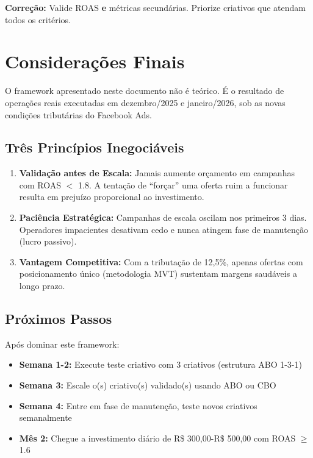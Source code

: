 \documentclass[12pt, a4paper]{article}
\newcommand{\reais}[1]{R\$ #1}
\begin{document}
\textbf{Correção:} Valide ROAS \textbf{e} métricas secundárias. Priorize criativos que atendam todos os critérios.

\needspace{8cm}

\pagebreak

\section{Considerações Finais}

O framework apresentado neste documento não é teórico. É o resultado de operações reais executadas em dezembro/2025 e janeiro/2026, sob as novas condições tributárias do Facebook Ads.

\subsection{Três Princípios Inegociáveis}

\begin{enumerate}
    \item \textbf{Validação antes de Escala:} Jamais aumente orçamento em campanhas com ROAS $<$ 1.8. A tentação de ``forçar'' uma oferta ruim a funcionar resulta em prejuízo proporcional ao investimento.

    \item \textbf{Paciência Estratégica:} Campanhas de escala oscilam nos primeiros 3 dias. Operadores impacientes desativam cedo e nunca atingem fase de manutenção (lucro passivo).

    \item \textbf{Vantagem Competitiva:} Com a tributação de 12,5\%, apenas ofertas com posicionamento único (metodologia MVT) sustentam margens saudáveis a longo prazo.
\end{enumerate}

\subsection{Próximos Passos}

Após dominar este framework:

\begin{itemize}
    \item \textbf{Semana 1-2:} Execute teste criativo com 3 criativos (estrutura ABO 1-3-1)
    \item \textbf{Semana 3:} Escale o(s) criativo(s) validado(s) usando ABO ou CBO
    \item \textbf{Semana 4:} Entre em fase de manutenção, teste novos criativos semanalmente
    \item \textbf{Mês 2:} Chegue a investimento diário de \reais{300,00}-\reais{500,00} com ROAS $\geq$ 1.6
\end{itemize}
\end{document}
